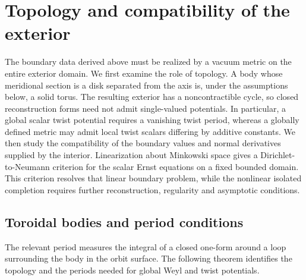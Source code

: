 \documentclass[amsmath,amsfonts,amssymb,aps,pra,superscriptaddress,10pt]{revtex4-2}
\numberwithin{equation}{section}
\theoremstyle{plain}
\theoremstyle{definition}
\theoremstyle{remark}
\theoremstyle{definition}
\begin{document}
\section{Topology and compatibility of the exterior}\label{topexterior}

The boundary data derived above must be realized by a vacuum metric on the entire exterior domain. We first examine the role of topology. A body whose meridional section is a disk separated from the axis is, under the assumptions below, a solid torus. The resulting exterior has a noncontractible cycle, so closed reconstruction forms need not admit single-valued potentials. In particular, a global scalar twist potential requires a vanishing twist period, whereas a globally defined metric may admit local twist scalars differing by additive constants. We then study the compatibility of the boundary values and normal derivatives supplied by the interior. Linearization about Minkowski space gives a Dirichlet-to-Neumann criterion for the scalar Ernst equations on a fixed bounded domain. This criterion resolves that linear boundary problem, while the nonlinear isolated completion requires further reconstruction, regularity and asymptotic conditions.

\subsection{Toroidal bodies and period conditions}

The relevant period measures the integral of a closed one-form around a loop surrounding the body in the orbit surface. The following theorem identifies the topology and the periods needed for global Weyl and twist potentials.
\end{document}
